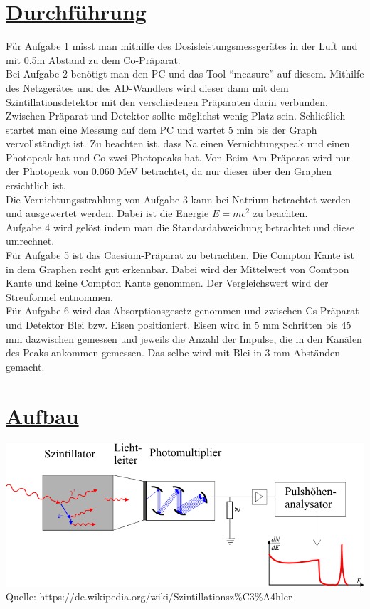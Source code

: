 \documentclass[11pt,a4paper]{article}
\begin{document}
 \section{\underline{Durchführung}}
  Für Aufgabe 1 misst man mithilfe des Dosisleistungsmessgerätes in der Luft und
  mit 0.5m Abstand zu dem Co-Präparat. \\
  Bei Aufgabe 2 benötigt man den PC und das Tool ``measure'' auf diesem.
  Mithilfe des Netzgerätes und des AD-Wandlers wird dieser dann mit dem Szintillationsdetektor
  mit den verschiedenen Präparaten darin verbunden.
  Zwischen Präparat und Detektor sollte möglichst wenig Platz sein.
  Schließlich startet man eine Messung auf dem PC und wartet 5 min bis der Graph vervollst\"andigt ist.
  Zu beachten ist, dass Na einen Vernichtungspeak und einen Photopeak hat und Co zwei Photopeaks hat.
  Von Beim Am-Präparat wird nur der Photopeak von 0.060 MeV betrachtet, da nur dieser über den Graphen ersichtlich   ist.
  \\Die Vernichtungsstrahlung von Aufgabe 3 kann bei Natrium betrachtet werden und ausgewertet werden.
  Dabei ist die Energie $E=mc^2$ zu beachten.
  \\Aufgabe 4 wird gelöst indem man die Standardabweichung betrachtet und diese umrechnet.
  \\Für Aufgabe 5 ist das Caesium-Präparat zu betrachten. Die Compton Kante ist
  in dem Graphen recht gut erkennbar. Dabei wird der Mittelwert von Comtpon Kante und keine Compton Kante genommen.
  Der Vergleichswert wird der Streuformel entnommen.
  \\Für Aufgabe 6 wird das Absorptionsgesetz genommen und zwischen Cs-Präparat und Detektor
  Blei bzw. Eisen positioniert. Eisen wird in 5 mm Schritten bis 45 mm dazwischen gemessen und jeweils die Anzahl
  der Impulse, die in den Kanälen des Peaks ankommen gemessen. Das selbe wird mit Blei in 3 mm Abständen gemacht.
\section{\underline{Aufbau}}
 \includegraphics{Bilder/Szint.png}
 \\ Quelle: https://de.wikipedia.org/wiki/Szintillationsz\%C3\%A4hler
\newpage
\end{document}
